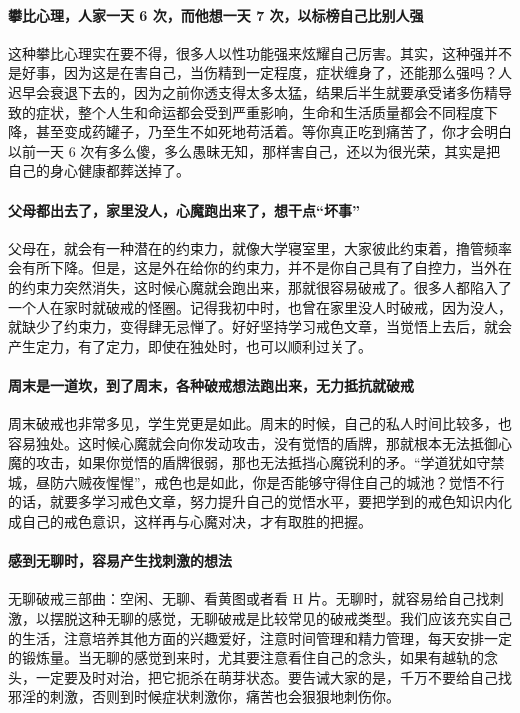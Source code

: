 \paragraph{攀比心理，人家一天 6 次，而他想一天 7 次，以标榜自己比别人强} 这种攀比心理实在要不得，很多人以性功能强来炫耀自己厉害。其实，这种强并不是好事，因为这是在害自己，当伤精到一定程度，症状缠身了，还能那么强吗？人迟早会衰退下去的，因为之前你透支得太多太猛，结果后半生就要承受诸多伤精导致的症状，整个人生和命运都会受到严重影响，生命和生活质量都会不同程度下降，甚至变成药罐子，乃至生不如死地苟活着。等你真正吃到痛苦了，你才会明白以前一天 6 次有多么傻，多么愚昧无知，那样害自己，还以为很光荣，其实是把自己的身心健康都葬送掉了。

\paragraph{父母都出去了，家里没人，心魔跑出来了，想干点“坏事”} 父母在，就会有一种潜在的约束力，就像大学寝室里，大家彼此约束着，撸管频率会有所下降。但是，这是外在给你的约束力，并不是你自己具有了自控力，当外在的约束力突然消失，这时候心魔就会跑出来，那就很容易破戒了。很多人都陷入了一个人在家时就破戒的怪圈。记得我初中时，也曾在家里没人时破戒，因为没人，就缺少了约束力，变得肆无忌惮了。好好坚持学习戒色文章，当觉悟上去后，就会产生定力，有了定力，即使在独处时，也可以顺利过关了。

\paragraph{周末是一道坎，到了周末，各种破戒想法跑出来，无力抵抗就破戒} 周末破戒也非常多见，学生党更是如此。周末的时候，自己的私人时间比较多，也容易独处。这时候心魔就会向你发动攻击，没有觉悟的盾牌，那就根本无法抵御心魔的攻击，如果你觉悟的盾牌很弱，那也无法抵挡心魔锐利的矛。“学道犹如守禁城，昼防六贼夜惺惺”，戒色也是如此，你是否能够守得住自己的城池？觉悟不行的话，就要多学习戒色文章，努力提升自己的觉悟水平，要把学到的戒色知识内化成自己的戒色意识，这样再与心魔对决，才有取胜的把握。

\paragraph{感到无聊时，容易产生找刺激的想法} 无聊破戒三部曲：空闲、无聊、看黄图或者看 H 片。无聊时，就容易给自己找刺激，以摆脱这种无聊的感觉，无聊破戒是比较常见的破戒类型。我们应该充实自己的生活，注意培养其他方面的兴趣爱好，注意时间管理和精力管理，每天安排一定的锻炼量。当无聊的感觉到来时，尤其要注意看住自己的念头，如果有越轨的念头，一定要及时对治，把它扼杀在萌芽状态。要告诫大家的是，千万不要给自己找邪淫的刺激，否则到时候症状刺激你，痛苦也会狠狠地刺伤你。

